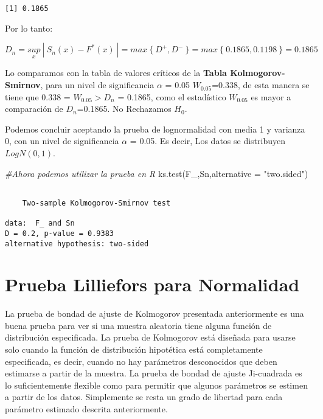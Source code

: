 \documentclass[
  a4paper,
  oneside,
  openany]{book}
\newenvironment{Shaded}{\begin{snugshade}}{\end{snugshade}}
\newcommand{\AttributeTok}[1]{\textcolor[rgb]{0.77,0.63,0.00}{#1}}
\newcommand{\CommentTok}[1]{\textcolor[rgb]{0.56,0.35,0.01}{\textit{#1}}}
\newcommand{\FunctionTok}[1]{\textcolor[rgb]{0.00,0.00,0.00}{#1}}
\newcommand{\NormalTok}[1]{#1}
\newcommand{\StringTok}[1]{\textcolor[rgb]{0.31,0.60,0.02}{#1}}
\begin{document}
\begin{verbatim}
[1] 0.1865
\end{verbatim}

Por lo tanto:

\[D_{n}=\underset{x}{sup} \ | \ S_{n}(x)-F^*(x)\ |=max\ \{\ D^+,D^- \ \}=max \ \{ \ 0.1865,0.1198 \ \}=0.1865\]

Lo comparamos con la tabla de valores críticos de la \textbf{Tabla Kolmogorov-Smirnov}, para un nivel de significancia \(\alpha\) = 0.05
\(W_{0.05}\)=0.338, de esta manera se tiene que 0.338 = \(W_{0.05} > D_{n}\) = 0.1865, como el estadístico \(W_{0.05}\) es mayor a comparación de \(D_{n}\)=0.1865.
No Rechazamos \(H_0\).

Podemos concluir aceptando la prueba de lognormalidad con media 1 y varianza 0, con un nivel de significancia \(\alpha\) = 0.05. Es decir, Los datos se distribuyen \(LogN(0,1)\).

\begin{Shaded}
\begin{Highlighting}[]
\CommentTok{\#Ahora podemos utilizar la prueba en R}
\FunctionTok{ks.test}\NormalTok{(F\_,Sn,}\AttributeTok{alternative =} \StringTok{"two.sided"}\NormalTok{)}
\end{Highlighting}
\end{Shaded}

\begin{verbatim}

    Two-sample Kolmogorov-Smirnov test

data:  F_ and Sn
D = 0.2, p-value = 0.9383
alternative hypothesis: two-sided
\end{verbatim}

\hypertarget{prueba-lilliefors-para-normalidad}{%
\chapter{Prueba Lilliefors para Normalidad}\label{prueba-lilliefors-para-normalidad}}

La prueba de bondad de ajuste de Kolmogorov presentada anteriormente es una buena prueba para ver si una muestra aleatoria tiene alguna función de distribución especificada. La prueba de Kolmogorov está diseñada para usarse solo cuando la función de distribución hipotética está completamente especificada, es decir, cuando no hay parámetros desconocidos que deben estimarse a partir de la muestra.
La prueba de bondad de ajuste Ji-cuadrada es lo suficientemente flexible como para permitir que algunos parámetros se estimen a partir de los datos. Simplemente se resta un grado de libertad para cada parámetro estimado descrita anteriormente.
\end{document}
